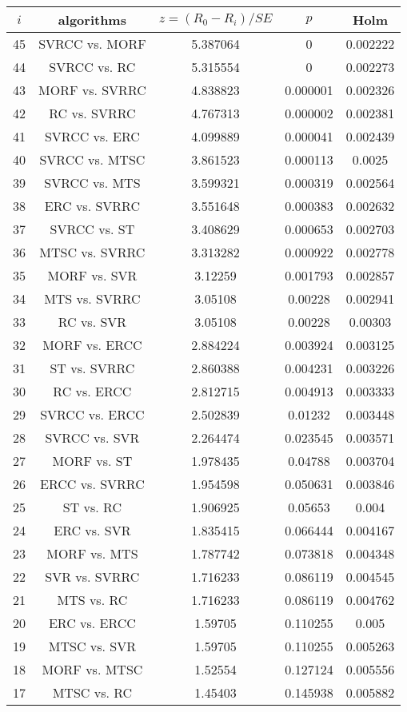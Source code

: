 \documentclass[a4paper,10pt]{article}
\begin{document}
\begin{landscape}
\begin{table}[!htp]
\centering\scriptsize
\begin{tabular}{ccccc}
$i$&algorithms&$z=(R_0 - R_i)/SE$&$p$&Holm\\
\hline45&SVRCC vs. MORF&5.387064&0&0.002222\\
44&SVRCC vs. RC&5.315554&0&0.002273\\
43&MORF vs. SVRRC&4.838823&0.000001&0.002326\\
42&RC vs. SVRRC&4.767313&0.000002&0.002381\\
41&SVRCC vs. ERC&4.099889&0.000041&0.002439\\
40&SVRCC vs. MTSC&3.861523&0.000113&0.0025\\
39&SVRCC vs. MTS&3.599321&0.000319&0.002564\\
38&ERC vs. SVRRC&3.551648&0.000383&0.002632\\
37&SVRCC vs. ST&3.408629&0.000653&0.002703\\
36&MTSC vs. SVRRC&3.313282&0.000922&0.002778\\
35&MORF vs. SVR&3.12259&0.001793&0.002857\\
34&MTS vs. SVRRC&3.05108&0.00228&0.002941\\
33&RC vs. SVR&3.05108&0.00228&0.00303\\
32&MORF vs. ERCC&2.884224&0.003924&0.003125\\
31&ST vs. SVRRC&2.860388&0.004231&0.003226\\
30&RC vs. ERCC&2.812715&0.004913&0.003333\\
29&SVRCC vs. ERCC&2.502839&0.01232&0.003448\\
28&SVRCC vs. SVR&2.264474&0.023545&0.003571\\
27&MORF vs. ST&1.978435&0.04788&0.003704\\
26&ERCC vs. SVRRC&1.954598&0.050631&0.003846\\
25&ST vs. RC&1.906925&0.05653&0.004\\
24&ERC vs. SVR&1.835415&0.066444&0.004167\\
23&MORF vs. MTS&1.787742&0.073818&0.004348\\
22&SVR vs. SVRRC&1.716233&0.086119&0.004545\\
21&MTS vs. RC&1.716233&0.086119&0.004762\\
20&ERC vs. ERCC&1.59705&0.110255&0.005\\
19&MTSC vs. SVR&1.59705&0.110255&0.005263\\
18&MORF vs. MTSC&1.52554&0.127124&0.005556\\
17&MTSC vs. RC&1.45403&0.145938&0.005882\\

\end{tabular}
\end{table}
\end{landscape}
\end{document}
